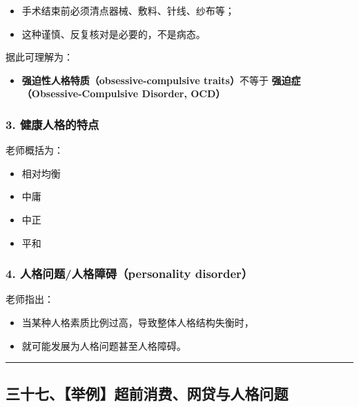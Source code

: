 \documentclass[
  chinese,
  9pt,
  a4paper,
]{ctexart}
\providecommand{\tightlist}{%
  \setlength{\itemsep}{0pt}\setlength{\parskip}{0pt}}
\begin{document}
\begin{itemize}
\tightlist
\item
  手术结束前必须清点器械、敷料、针线、纱布等；
\item
  这种谨慎、反复核对是必要的，不是病态。
\end{itemize}

据此可理解为：

\begin{itemize}
\tightlist
\item
  \textbf{强迫性人格特质（obsessive-compulsive traits）}不等于
  \textbf{强迫症（Obsessive-Compulsive Disorder, OCD）}
\end{itemize}

\subsubsection{3.
健康人格的特点}\label{ux5065ux5eb7ux4ebaux683cux7684ux7279ux70b9}

老师概括为：

\begin{itemize}
\tightlist
\item
  相对均衡
\item
  中庸
\item
  中正
\item
  平和
\end{itemize}

\subsubsection{4. 人格问题/人格障碍（personality
disorder）}\label{ux4ebaux683cux95eeux9898ux4ebaux683cux969cux788dpersonality-disorder}

老师指出：

\begin{itemize}
\tightlist
\item
  当某种人格素质比例过高，导致整体人格结构失衡时，
\item
  就可能发展为人格问题甚至人格障碍。
\end{itemize}

\begin{center}\rule{0.5\linewidth}{0.5pt}\end{center}

\subsection{三十七、【举例】超前消费、网贷与人格问题}\label{ux4e09ux5341ux4e03ux4e3eux4f8bux8d85ux524dux6d88ux8d39ux7f51ux8d37ux4e0eux4ebaux683cux95eeux9898}
\end{document}
